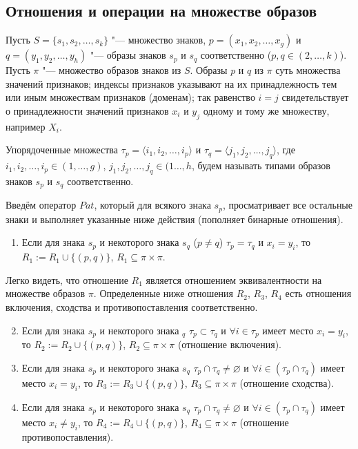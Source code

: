 \subsection{Отношения и операции на множестве образов}\label{subsect_2_3_1}

Пусть $S=\{s_1,s_2,\dots,s_k\}$ "--- множество знаков, $p=(x_1,x_2,\dots,x_g)$ и $q=(y_1,y_2,\dots,y_h)$ "--- образы знаков $s_p$ и $s_q$ соответственно ($p,q\in(2,\dots,k)$).
Пусть $\pi$ "--- множество образов знаков из $S$. Образы $p$ и $q$ из $\pi$ суть множества значений признаков; индексы признаков указывают на их принадлежность тем или иным множествам признаков (доменам); так равенство $i=j$ свидетельствует о принадлежности значений признаков $x_i$ и $y_j$ одному и тому же множеству, например $X_i$.

Упорядоченные множества $\tau_p=\langle i_1,i_2,\dots,i_p\rangle$ и $\tau_q=\langle j_1,j_2,\dots,j_q\rangle$, где $i_1,i_2,\dots,i_p\in(1,\dots,g)$, $j_1,j_2,\dots,j_q\in(1\dots,h$, будем называть типами образов знаков $s_p$ и $s_q$ соответственно.

Введём оператор $Pat$, который для всякого знака $s_p$, просматривает все остальные знаки и выполняет указанные ниже действия (пополняет бинарные отношения).
\begin{enumerate}
	\renewcommand\labelenumi{\theenumi.}
	\item Если для знака $s_p$ и некоторого знака $s_q$ ($p\not =q$) $\tau_p=\tau_q$ и $x_i=y_i$, то $R_1:=R_1\cup\{(p,q)\}$, $R_1\subseteq\pi\times\pi$.
\end{enumerate}
Легко видеть, что отношение $R_1$ является отношением эквивалентности на множестве образов $\pi$. Определенные ниже отношения $R_2$, $R_3$, $R_4$ есть отношения включения, сходства и противопоставления соответственно.
\begin{enumerate}
	\setcounter{enumi}{1}
	\renewcommand\labelenumi{\theenumi.}
	\item Если для знака $s_p$ и некоторого знака $_q$ $\tau_p\subset\tau_q$ и $\forall i\in\tau_p$ имеет место $x_i=y_i$, то $R_2:=R_2\cup\{(p,q)\}$, $R_2\subseteq\pi\times\pi$ (отношение включения).
	\item Если для знака $s_p$ и некоторого знака $s_q$ $\tau_p\cap\tau_q\not =\varnothing$ и $\forall i\in(\tau_p\cap\tau_q)$ имеет место $x_i=y_i$, то $R_3:=R_3\cup\{(p,q)\}$, $R_3\subseteq\pi\times\pi$ (отношение сходства).
	\item Если для знака $s_p$ и некоторого знака $s_q$ $\tau_p\cap\tau_q\not =\varnothing$ и $\forall i\in(\tau_p\cap\tau_q)$ имеет место $x_i\not =y_i$, то $R_4:=R_4\cup\{(p,q)\}$, $R_4\subseteq\pi\times\pi$ (отношение противопоставления).
\end{enumerate}

